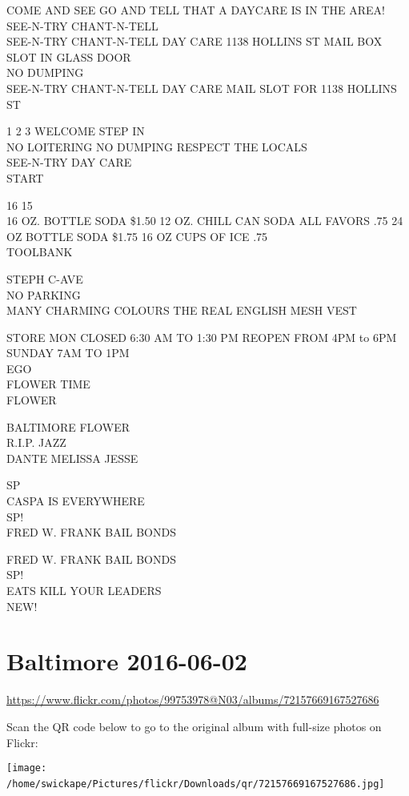 \documentclass[10pt,letterpaper]{article}
\begin{document}
COME AND SEE GO AND TELL THAT A DAYCARE IS IN THE AREA!  SEE{-}N{-}TRY CHANT{-}N{-}TELL\\
SEE{-}N{-}TRY CHANT{-}N{-}TELL DAY CARE 1138 HOLLINS ST MAIL BOX SLOT IN GLASS DOOR\\
NO DUMPING\\
SEE{-}N{-}TRY CHANT{-}N{-}TELL DAY CARE MAIL SLOT FOR 1138 HOLLINS ST

1 2 3 WELCOME STEP IN\\
NO LOITERING NO DUMPING RESPECT THE LOCALS\\
SEE{-}N{-}TRY DAY CARE\\
START

16 15\\
16 OZ. BOTTLE SODA \$1.50 12 OZ. CHILL CAN SODA ALL FAVORS .75 24 OZ BOTTLE SODA \$1.75 16 OZ CUPS OF ICE .75\\
TOOLBANK

STEPH C{-}AVE\\
NO PARKING\\
MANY CHARMING COLOURS THE REAL ENGLISH MESH VEST

STORE MON CLOSED 6:30 AM TO 1:30 PM REOPEN FROM 4PM to 6PM SUNDAY 7AM TO 1PM\\
EGO\\
FLOWER TIME\\
FLOWER

BALTIMORE FLOWER\\
R.I.P. JAZZ\\
DANTE MELISSA JESSE

SP\\
CASPA IS EVERYWHERE\\
SP!\\
FRED W. FRANK BAIL BONDS

FRED W. FRANK BAIL BONDS\\
SP!\\
EATS KILL YOUR LEADERS\\
NEW!
\

\section*{Baltimore 2016-06-02}

\url{https://www.flickr.com/photos/99753978@N03/albums/72157669167527686}

Scan the QR code below to go to the original album with full-size photos on Flickr:

\texttt{[image: /home/swickape/Pictures/flickr/Downloads/qr/72157669167527686.jpg]}
\
\end{document}
